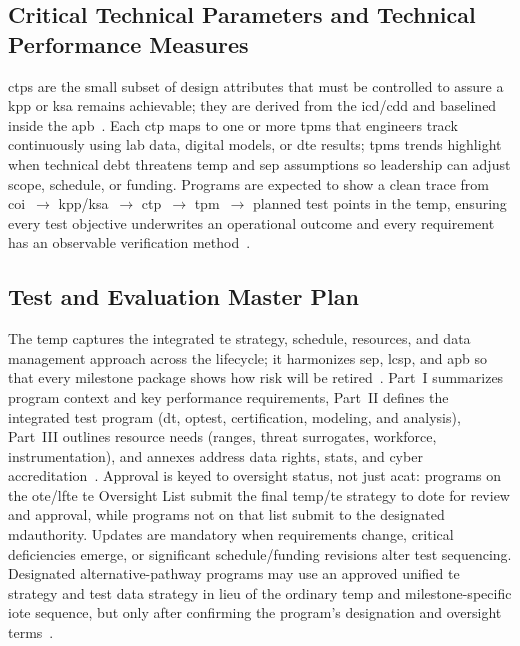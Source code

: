 \documentclass[../main.tex]{subfiles}
\begin{document}
\subsection{Critical Technical Parameters and Technical Performance Measures}
\acp{ctp} are the small subset of design attributes that must be controlled to assure a \ac{kpp} or \ac{ksa} remains achievable; they are derived from the \ac{icd}/\ac{cdd} and baselined inside the \ac{apb}~\autocite{DoDI5000-85}. Each \ac{ctp} maps to one or more \acp{tpm} that engineers track continuously using lab data, digital models, or \ac{dte} results; \acp{tpm} trends highlight when technical debt threatens \ac{temp} and \ac{sep} assumptions so leadership can adjust scope, schedule, or funding. Programs are expected to show a clean trace from \ac{coi}~$\rightarrow$ \ac{kpp}/\ac{ksa}~$\rightarrow$ \ac{ctp}~$\rightarrow$ \ac{tpm}~$\rightarrow$ planned test points in the \ac{temp}, ensuring every test objective underwrites an operational outcome and every requirement has an observable verification method~\autocite{DoDI5000-89,edo-3-5-5-test-eval-part-i-2025}.

\subsection{Test and Evaluation Master Plan}
The \ac{temp} captures the integrated \ac{te} strategy, schedule, resources, and data management approach across the lifecycle; it harmonizes \ac{sep}, \ac{lcsp}, and \ac{apb} so that every milestone package shows how risk will be retired~\autocite{DoDM5000-100}. Part~I summarizes program context and key performance requirements, Part~II defines the integrated test program (\ac{dt}, \ac{optest}, certification, modeling, and analysis), Part~III outlines resource needs (ranges, threat surrogates, workforce, instrumentation), and annexes address data rights, stats, and cyber accreditation~\autocite{DoDM5000-100}. Approval is keyed to oversight status, not just \ac{acat}: programs on the \ac{ote}/\ac{lfte} \ac{te} Oversight List submit the final \ac{temp}/\ac{te} strategy to \ac{dote} for review and approval, while programs not on that list submit to the designated \ac{mdauthority}. Updates are mandatory when requirements change, critical deficiencies emerge, or significant schedule/funding revisions alter test sequencing. Designated alternative-pathway programs may use an approved unified \ac{te} strategy and test data strategy in lieu of the ordinary \ac{temp} and milestone-specific \ac{iote} sequence, but only after confirming the program's designation and oversight terms~\autocite{USC-10-4171,DoDI5000-85,DoDM5000-100}.
\end{document}
